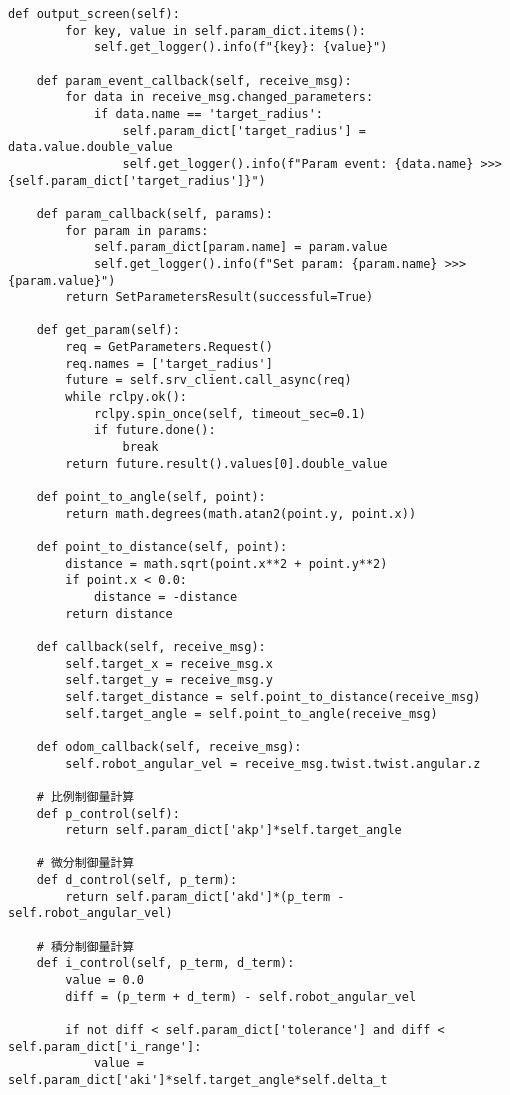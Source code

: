 \begin{lstlisting}[caption=base\_controller.py, label=base]
    def output_screen(self):
        for key, value in self.param_dict.items():
            self.get_logger().info(f"{key}: {value}")

    def param_event_callback(self, receive_msg):
        for data in receive_msg.changed_parameters:
            if data.name == 'target_radius':
                self.param_dict['target_radius'] = data.value.double_value
                self.get_logger().info(f"Param event: {data.name} >>> {self.param_dict['target_radius']}")

    def param_callback(self, params):
        for param in params:
            self.param_dict[param.name] = param.value
            self.get_logger().info(f"Set param: {param.name} >>> {param.value}")
        return SetParametersResult(successful=True)

    def get_param(self):
        req = GetParameters.Request()
        req.names = ['target_radius']
        future = self.srv_client.call_async(req)
        while rclpy.ok():
            rclpy.spin_once(self, timeout_sec=0.1)
            if future.done():
                break
        return future.result().values[0].double_value

    def point_to_angle(self, point):
        return math.degrees(math.atan2(point.y, point.x))

    def point_to_distance(self, point):
        distance = math.sqrt(point.x**2 + point.y**2)
        if point.x < 0.0:
            distance = -distance
        return distance

    def callback(self, receive_msg):
        self.target_x = receive_msg.x
        self.target_y = receive_msg.y
        self.target_distance = self.point_to_distance(receive_msg)
        self.target_angle = self.point_to_angle(receive_msg)

    def odom_callback(self, receive_msg):
        self.robot_angular_vel = receive_msg.twist.twist.angular.z

    # 比例制御量計算
    def p_control(self):
        return self.param_dict['akp']*self.target_angle

    # 微分制御量計算
    def d_control(self, p_term):
        return self.param_dict['akd']*(p_term - self.robot_angular_vel)

    # 積分制御量計算
    def i_control(self, p_term, d_term):
        value = 0.0
        diff = (p_term + d_term) - self.robot_angular_vel

        if not diff < self.param_dict['tolerance'] and diff < self.param_dict['i_range']:
            value = self.param_dict['aki']*self.target_angle*self.delta_t


\end{lstlisting}
